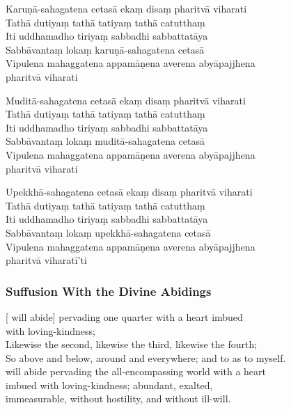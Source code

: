 Karuṇā-sahagatena cetasā ekaṃ disaṃ pharitvā viharati\\
Tathā dutiyaṃ tathā tatiyaṃ tathā catutthaṃ\\
Iti uddhamadho tiriyaṃ sabbadhi sabbattatāya\\
Sabbāvantaṃ lokaṃ karuṇā-sahagatena cetasā\\
Vipulena mahaggatena appamāṇena averena abyāpajjhena\\
\vin pharitvā viharati

Muditā-sahagatena cetasā ekaṃ disaṃ pharitvā viharati\\
Tathā dutiyaṃ tathā tatiyaṃ tathā catutthaṃ\\
Iti uddhamadho tiriyaṃ sabbadhi sabbattatāya\\
Sabbāvantaṃ lokaṃ muditā-sahagatena cetasā\\
Vipulena mahaggatena appamāṇena averena abyāpajjhena\\
\vin pharitvā viharati

Upekkhā-sahagatena cetasā ekaṃ disaṃ pharitvā viharati\\
Tathā dutiyaṃ tathā tatiyaṃ tathā catutthaṃ\\
Iti uddhamadho tiriyaṃ sabbadhi sabbattatāya\\
Sabbāvantaṃ lokaṃ upekkhā-sahagatena cetasā\\
Vipulena mahaggatena appamāṇena averena abyāpajjhena\\
\vin pharitvā viharatī'ti


\subsubsection{Suffusion With the Divine Abidings}


\begin{leader}
\end{leader}

[ will abide] pervading one quarter with a heart imbued\\
\vin with loving-kindness;\\
Likewise the second, likewise the third, likewise the fourth;\\
So above and below, around and everywhere; and to  as to myself.\\
 will abide pervading the all-encompassing world with a heart \\
\vin imbued with loving-kindness; abundant, exalted,\\
\vin immeasurable, without hostility, and without ill-will.

